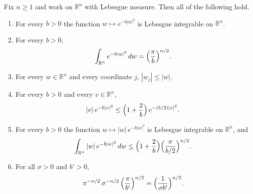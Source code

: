 \begin{lemma}
Fix $n \geq 1$ and work on $\mathbb{R}^n$ with Lebesgue measure.  Then all of the
following hold.
\begin{enumerate}
  \item For every $b > 0$ the function $w \mapsto e^{-b|w|^2}$ is Lebesgue integrable
    on $\mathbb{R}^n$.
  \item For every $b > 0$,
    \[
      \int_{\mathbb{R}^n} e^{-b|w|^2}\,dw = \Bigl(\frac{\pi}{b}\Bigr)^{n/2}.
    \]
  \item For every $w \in \mathbb{R}^n$ and every coordinate $j$, $|w_j| \leq |w|$.
  \item For every $b > 0$ and every $v \in \mathbb{R}^n$,
    \[
      |v|\,e^{-b|v|^2} \leq \Bigl(1 + \frac{2}{b}\Bigr)\,e^{-(b/2)|v|^2}.
    \]
  \item For every $b > 0$ the function $w \mapsto |w|\,e^{-b|w|^2}$ is Lebesgue
    integrable on $\mathbb{R}^n$, and
    \[
      \int_{\mathbb{R}^n} |w|\,e^{-b|w|^2}\,dw
        \leq \Bigl(1 + \frac{2}{b}\Bigr)\Bigl(\frac{\pi}{b/2}\Bigr)^{n/2}.
    \]
  \item For all $\sigma > 0$ and $b' > 0$,
    \[
      \pi^{-n/2}\,\sigma^{-n/2}\,\Bigl(\frac{\pi}{b'}\Bigr)^{n/2}
        = \Bigl(\frac{1}{\sigma b'}\Bigr)^{n/2}.
    \]
\end{enumerate}
\end{lemma}
